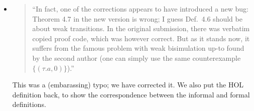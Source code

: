\begin{itemize}
\item \begin{quote}
    ``In fact, one of the corrections appears to have introduced a new
    bug: Theorem 4.7 in the new version is wrong; I guess Def.~4.6
    should be about weak transitions. In the original submission,
    there was verbatim copied proof code, which was however
    correct. But as it stands now, it suffers from the famous problem
    with weak bisimulation up-to found by the second author (one can
    simply use the same counterexample $\{(\tau. a , 0)\}$).''
  \end{quote}
  \Mark
  This was a (embarassing) typo; we have corrected it. 
We also put the HOL definition back, to show the correspondence between the informal and formal definitions.



 



\end{itemize}
